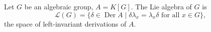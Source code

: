 Let $G$ be an algebraic group, $A = K[G]$. The Lie algebra of $G$ is
$$\mathcal{L}(G) = \{\delta \in \operatorname{Der} A \mid \delta \lambda_x = \lambda_x \delta \text{ for all } x \in G\},$$
the space of left-invariant derivations of $A$.
